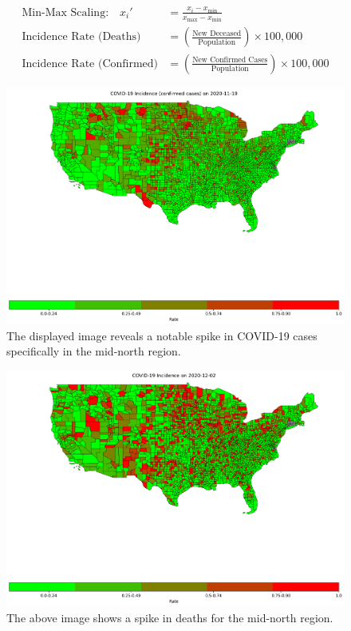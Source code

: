 \documentclass[sigconf,screen,nonacm]{acmart}
\begin{document}
{\tiny
\begin{align*}
\text{Min-Max Scaling:} \quad x_i' &= \frac{x_i - x_{\text{min}}}{x_{\text{max}} - x_{\text{min}}} \\
\text{Incidence Rate (Deaths)} &= \left(\frac{\text{New Deceased}}{\text{Population}}\right) \times 100,000 \\
\text{Incidence Rate (Confirmed)} &= \left(\frac{\text{New Confirmed Cases}}{\text{Population}}\right) \times 100,000
\end{align*}
}
\begin{figure}[h]
  \centering
  \includegraphics[width=.8\linewidth]{Figures/IncidenceRate_covidCases2020-11-19.png}
  \caption{The displayed image reveals a notable spike in COVID-19 cases specifically in the mid-north region.}
\end{figure}

\begin{figure}[h]
  \centering
  \includegraphics[width=.8\linewidth]{Figures/IncidenceDeathRate_2020-12-02.png}
  \caption{The above image shows a spike in deaths for the mid-north region.}
\end{figure}
\end{document}
